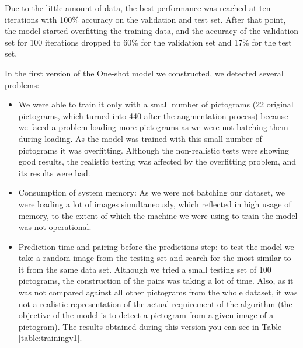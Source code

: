 Due to the little amount of data, the best performance was reached at ten iterations with 100\% accuracy on the validation and test set. After that point, the model started overfitting the training data, and the accuracy of the validation set for 100 iterations dropped to 60\% for the validation set and 17\% for the test set.

In the first version of the One-shot model we constructed, we detected several problems:

\begin{itemize}
  \item We were able to train it only with a small number of pictograms (22 original pictograms, which turned into 440 after the augmentation process) because we faced a problem loading more pictograms as we were not batching them during loading. As the model was trained with this small number of pictograms it was overfitting. Although the non-realistic tests were showing good results, the realistic testing was affected by the overfitting problem, and its results were bad.
  \item Consumption of system memory: As we were not batching our dataset, we were loading a lot of images simultaneously, which reflected in high usage of memory, to the extent of which the machine we were using to train the model was not operational.
  \item Prediction time and pairing before the predictions step: to test the model we take a random image from the testing set and search for the most similar to it from the same data set. Although we tried a small testing set of 100 pictograms, the construction of the pairs was taking a lot of time. Also, as it was not compared against all other pictograms from the whole dataset, it was not a realistic representation of the actual requirement of the algorithm (the objective of the model is to detect a pictogram from a given image of a pictogram). The results obtained during this version you can see in Table \ref{table:trainingv1}.
\end{itemize}

\begin{table}[!ht]
\begin{center}
\end{center}
\caption{Results from version one of the pictogram identification algorithm.}
\label{table:trainingv1}
\end{table}

